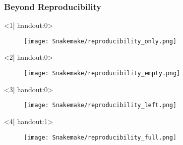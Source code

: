 \begin{frame}
  \frametitle{Beyond Reproducibility}
  \begin{onlyenv}<1| handout:0>
    \begin{figure}
      \centering
      \texttt{[image: Snakemake/reproducibility\_only.png]}
    \end{figure}
  \end{onlyenv}
  \begin{onlyenv}<2| handout:0>
    \begin{figure}
      \centering
      \texttt{[image: Snakemake/reproducibility\_empty.png]}
    \end{figure}
  \end{onlyenv}
  \begin{onlyenv}<3| handout:0>
    \begin{figure}
      \centering
      \texttt{[image: Snakemake/reproducibility\_left.png]}
    \end{figure}
  \end{onlyenv}
    \begin{onlyenv}<4| handout:1>
      \begin{figure}
        \centering
        \texttt{[image: Snakemake/reproducibility\_full.png]}
      \end{figure}
  \end{onlyenv}
  \footnotesize{}
\end{frame}
